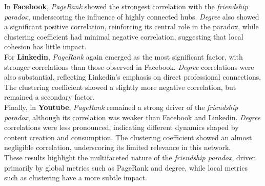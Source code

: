 \documentclass{article}
\begin{document}
In \textbf{Facebook}, \textit{PageRank} showed the strongest correlation with the \textit{friendship paradox}, underscoring the influence of highly connected hubs. \textit{Degree} also showed a significant positive correlation, reinforcing its central role in the paradox, while clustering coefficient had minimal negative correlation, suggesting that local cohesion has little impact. \\
For \textbf{Linkedin}, \textit{PageRank} again emerged as the most significant factor, with stronger correlations than those observed in Facebook. \textit{Degree} correlations were also substantial, reflecting Linkedin's emphasis on direct professional connections. The clustering coefficient showed a slightly more negative correlation, but remained a secondary factor. \\ 
Finally, in \textbf{Youtube}, \textit{PageRank} remained a strong driver of the \textit{friendship paradox}, although its correlation was weaker than Facebook and Linkedin. \textit{Degree} correlations were less pronounced, indicating different dynamics shaped by content creation and consumption. The clustering coefficient showed an almost negligible correlation, underscoring its limited relevance in this network. \\
These results highlight the multifaceted nature of the \textit{friendship paradox}, driven primarily by global metrics such as PageRank and degree, while local metrics such as clustering have a more subtle impact.
\end{document}
